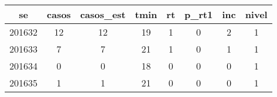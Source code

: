 \begin{tabular}{c|ccccccc}
  \hline
se & casos & casos\_est & tmin & rt & p\_rt1 & inc & nivel \\ 
  \hline
201632 & 12 & 12 & 19 & 1 & 0 & 2 & 1 \\ 
  201633 & 7 & 7 & 21 & 1 & 0 & 1 & 1 \\ 
  201634 & 0 & 0 & 18 & 0 & 0 & 0 & 1 \\ 
  201635 & 1 & 1 & 21 & 0 & 0 & 0 & 1 \\ 
   \hline
\end{tabular}
